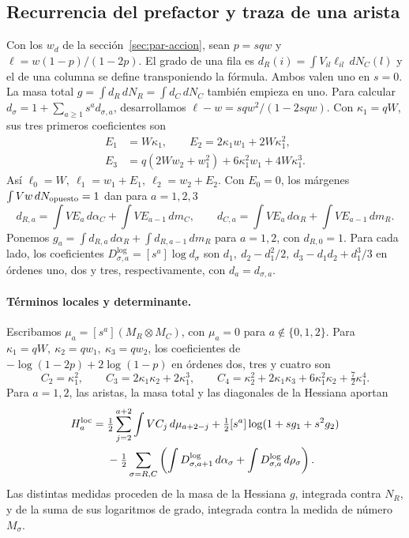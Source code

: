 \subsection{Recurrencia del prefactor y traza de una arista}\label{sec:par-prefactor}

Con los \(w_d\) de la sección~\ref{sec:par-accion}, sean \(p=sqw\) y
\(\ell=w(1-p)/(1-2p)\). El grado de una fila es
\(d_R(i)=\int V_{il}\ell_{il}\,dN_C(l)\) y el de una columna se define transponiendo
la fórmula. Ambos valen uno en \(s=0\). La masa total
\(g=\int d_R\,dN_R=\int d_C\,dN_C\) también empieza en uno. Para calcular
\(d_\sigma=1+\sum_{a\ge1}s^a d_{\sigma,a}\), desarrollamos
\(\ell-w=sqw^2/(1-2sqw)\). Con \(\kappa_1=qW\), sus tres primeros coeficientes son
\begin{align*}
 E_1&=W\kappa_1,\qquad E_2=2\kappa_1 w_1+2W\kappa_1^2,\\
 E_3&=q(2Ww_2+w_1^2)+6\kappa_1^2w_1+4W\kappa_1^3 .
\end{align*}
Así \(\ell_0=W,\ \ell_1=w_1+E_1,\ \ell_2=w_2+E_2\). Con \(E_0=0\), los márgenes
\(\int Vw\,dN_{\rm opuesto}=1\) dan para \(a=1,2,3\)
\[
 d_{R,a}=\int VE_a\,d\alpha_C+\int VE_{a-1}\,dm_C,\qquad
 d_{C,a}=\int VE_a\,d\alpha_R+\int VE_{a-1}\,dm_R .
\]
Ponemos \(g_a=\int d_{R,a}\,d\alpha_R+\int d_{R,a-1}\,dm_R\) para \(a=1,2\),
con \(d_{R,0}=1\). Para cada lado, los coeficientes \(D_{\sigma,a}^{\log}=[s^a]\log d_\sigma\)
son \(d_1,\ d_2-d_1^2/2,\ d_3-d_1d_2+d_1^3/3\) en órdenes uno, dos y tres,
respectivamente, con \(d_a=d_{\sigma,a}\).

\paragraph{Términos locales y determinante.}
Escribamos \(\mu_a=[s^a](M_R\otimes M_C)\), con \(\mu_a=0\) para \(a\notin\{0,1,2\}\).
Para \(\kappa_1=qW,\ \kappa_2=qw_1,\ \kappa_3=qw_2\), los coeficientes de
\(-\log(1-2p)+2\log(1-p)\) en órdenes dos, tres y cuatro son
\[
 C_2=\kappa_1^2,\qquad C_3=2\kappa_1\kappa_2+2\kappa_1^3,\qquad
 C_4=\kappa_2^2+2\kappa_1\kappa_3+6\kappa_1^2\kappa_2+\tfrac72\kappa_1^4 .
\]
Para \(a=1,2\), las aristas, la masa total y las diagonales de la Hessiana aportan
\begin{align*}
 H_a^{\rm loc}={}&\tfrac12\sum_{j=2}^{a+2}\int V C_j\,d\mu_{a+2-j}
 +\tfrac12[s^a]\log(1+sg_1+s^2g_2)\\
 &-\tfrac12\sum_{\sigma=R,C}
 \left(\int D_{\sigma,a+1}^{\log}\,d\alpha_\sigma+
       \int D_{\sigma,a}^{\log}\,d\rho_\sigma\right).
\end{align*}
Las distintas medidas proceden de la masa de la Hessiana \(g\), integrada contra \(N_R\),
y de la suma de sus logaritmos de grado, integrada contra la medida de número \(M_\sigma\).

